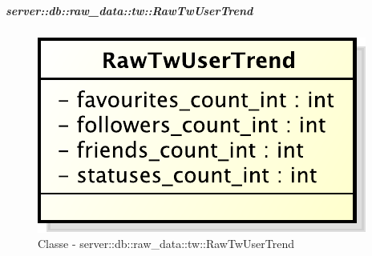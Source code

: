 		\subparagraph{server::db::raw\_data::tw::RawTwUserTrend} %
		\label{subp:server_db_raw_data_tw_rawtwusertrend}
			\begin{figure}[htbp]
				\centering
				\centerline{\includegraphics[scale=0.75]{./images/server/classes/db/raw_tw_user_trend.pdf}}
				\caption{Classe - server::db::raw\_data::tw::RawTwUserTrend}
			\end{figure}
